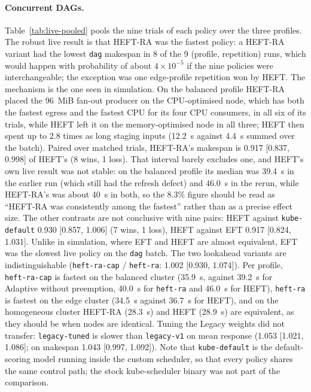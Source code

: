 \documentclass[12pt,a4paper]{report}
\newcommand{\pol}[1]{\texttt{#1}}
\begin{document}
\paragraph{Concurrent DAGs.} Table~\ref{tab:live-pooled} pools the nine
trials of each policy over the three profiles. The robust live result is
that HEFT-RA was the fastest policy: a HEFT-RA variant had the lowest
\texttt{dag} makespan in 8 of the 9 (profile, repetition) runs, which would
happen with probability of about $4\times10^{-5}$ if the nine policies were
interchangeable; the exception was one edge-profile repetition won by HEFT.
The mechanism is the one seen in simulation. On the balanced profile
HEFT-RA placed the 96~MiB fan-out producer on the CPU-optimised node,
which has both the fastest egress and the fastest CPU for its four CPU
consumers, in all six of its trials, while HEFT left it on the
memory-optimised node in all three; HEFT then spent up to 2.8 times as long
staging inputs (12.2~s against 4.4~s summed over the batch). Paired over matched trials, HEFT-RA's makespan is
0.917 [0.837, 0.998] of HEFT's (8 wins, 1 loss). That interval barely
excludes one, and HEFT's own live result was not stable: on the balanced
profile its median was 39.4~s in the earlier run (which still had the
refresh defect) and 46.0~s in the rerun,
while HEFT-RA's was about 40~s in both, so the 8.3\% figure should be read
as ``HEFT-RA was consistently among the fastest'' rather than as a
precise effect size. The other contrasts are not conclusive with nine
pairs: HEFT against \pol{kube-default} 0.930 [0.857, 1.006] (7 wins, 1
loss), HEFT against EFT 0.917 [0.824, 1.031]. Unlike in simulation, where
EFT and HEFT are almost equivalent, EFT was the slowest live policy on the
\texttt{dag} batch. The two lookahead variants are indistinguishable
(\pol{heft-ra-cap} / \pol{heft-ra}: 1.002 [0.930, 1.074]). Per profile,
\pol{heft-ra-cap} is fastest on the balanced cluster (35.9~s, against
39.2~s for Adaptive without preemption, 40.0~s for \pol{heft-ra} and
46.0~s for HEFT), \pol{heft-ra} is fastest on the edge cluster (34.5~s
against 36.7~s for HEFT), and on the homogeneous cluster HEFT-RA (28.3~s)
and HEFT (28.9~s) are equivalent, as they should be when nodes are
identical. Tuning the Legacy weights did not transfer: \pol{legacy-tuned}
is slower than \pol{legacy-v1} on mean response (1.053 [1.021, 1.086]; on
makespan 1.043 [0.997, 1.092]). Note that \pol{kube-default} is the
default-scoring model running inside the custom scheduler, so that every
policy shares the same control path; the stock kube-scheduler binary was
not part of the comparison.
\end{document}
